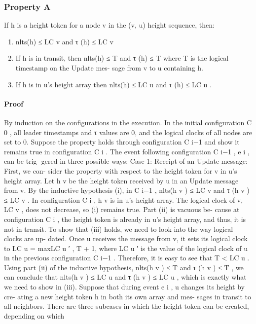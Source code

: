 \documentclass{article}
\begin{document}
\subsubsection{Property A}
If h is a height token for a node v in the (v, u)
height sequence, then:
\begin{enumerate}
\item nlts(h) ≤ LC v and τ (h) ≤ LC v
\item If h is in transit, then
nlts(h) ≤ T and τ (h) ≤ T
where T is the logical timestamp on the Update mes-
sage from v to u containing h.
\item If h is in u’s height array then
nlts(h) ≤ LC u and τ (h) ≤ LC u .
\end{enumerate}

\paragraph{Proof}
By induction on the configurations in the execution.
In the initial configuration C 0 , all leader timestamps and
τ values are 0, and the logical clocks of all nodes are set to
0. Suppose the property holds through configuration C i−1
and show it remains true in configuration C i .
The event following configuration C i−1 , e i , can be trig-
gered in three possible ways:
Case 1: Receipt of an Update message: First, we con-
sider the property with respect to the height token for v in
u’s height array. Let h v be the height token received by u in
an Update message from v. By the inductive hypothesis (i),
in C i−1 , nlts(h v ) ≤ LC v and τ (h v ) ≤ LC v . In configuration
C i , h v is in u’s height array. The logical clock of v, LC v , does
not decrease, so (i) remains true. Part (ii) is vacuous be-
cause at configuration C i , the height token is already in u’s
height array, and thus, it is not in transit. To show that (iii)
holds, we need to look into the way logical clocks are up-
dated. Once u receives the message from v, it sets its logical
clock to LC u = max{LC u ′ , T } + 1, where LC u ′ is the value
of the logical clock of u in the previous configuration C i−1 .
Therefore, it is easy to see that T < LC u . Using part (ii) of
the inductive hypothesis, nlts(h v ) ≤ T and τ (h v ) ≤ T , we
can conclude that nlts(h v ) ≤ LC u and τ (h v ) ≤ LC u , which is
exactly what we need to show in (iii).
Suppose that during event e i , u changes its height by cre-
ating a new height token h in both its own array and mes-
sages in transit to all neighbors. There are three subcases in
which the height token can be created, depending on which
\end{document}
